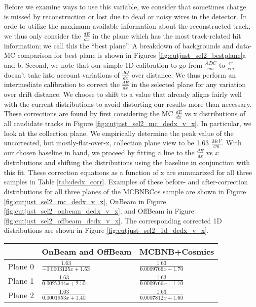 \par Before we examine ways to use this variable, we consider that sometimes charge is missed by reconstruction or lost due to dead or noisy wires in the detector. In orde to utilize the maximum available information about the reconstructed track, we thus only consider the $\frac{dE}{dx}$ in the plane which has the most track-related hit information; we call this the ``best plane''. A breakdown of backgrounds and data-MC comparison for best plane is shown in Figures \ref{fig:cutjust_sel2_bestplane}a and b. Second, we note that our simple 1D calibration to go from $\frac{ADC}{cm}$ to $\frac{e^-}{cm}$ doesn't take into account variations of $\frac{dQ}{dx}$ over distance. We thus perform an intermediate calibration to correct the $\frac{dE}{dx}$ in the selected plane for any variation over drift distance. We choose to shift to a value that already aligns fairly well with the current distributions to avoid distorting our results more than necessary.  These corrections are found by first considering the MC $\frac{dE}{dx}$ vs x distributions of all candidate tracks in Figure \ref{fig:cutjust_sel2_mc_dedx_v_x}. In particular, we look at the collection plane. We empirically determine the peak value of the uncorrected, but mostly-flat-over-x, collection plane view to be 1.63 $\frac{MeV}{cm}$.  With our chosen baseline in hand, we proceed by fitting a line to the $\frac{dE}{dx}$ vs $x$ distributions and shifting the distributions using the baseline in conjunction with this fit. These correction equations as a function of x are summarized for all three samples in Table \ref{tab:dedx_corr}. Examples of these before- and after-correction distributions for all three planes of the MCBNBCos sample are shown in Figure \ref{fig:cutjust_sel2_mc_dedx_v_x}, OnBeam in Figure \ref{fig:cutjust_sel2_onbeam_dedx_v_x}, and OffBeam in Figure \ref{fig:cutjust_sel2_offbeam_dedx_v_x}. The corresponding corrected 1D distributions are shown in Figure \ref{fig:cutjust_sel2_1d_dedx_v_x}.  


\begin{table} 
 \centering
 \begin{tabular}{| l | l | l |}
  \hline
  & OnBeam and OffBeam & MCBNB+Cosmics \\ [0.1ex] \hline
Plane 0 & $\frac{1.63}{-0.0003125x + 1.53}$ & $\frac{1.63}{0.0009766x + 1.70}$ \\ \hline
Plane 1 & $\frac{1.63}{0.0027344x + 2.50}$ & $\frac{1.63}{0.0009766x + 1.70}$ \\ \hline 
Plane 2 & $\frac{1.63}{0.0001953x + 1.40}$ & $\frac{1.63}{0.0007812x + 1.60}$ \\  \hline
\end{tabular}
\end{table}


